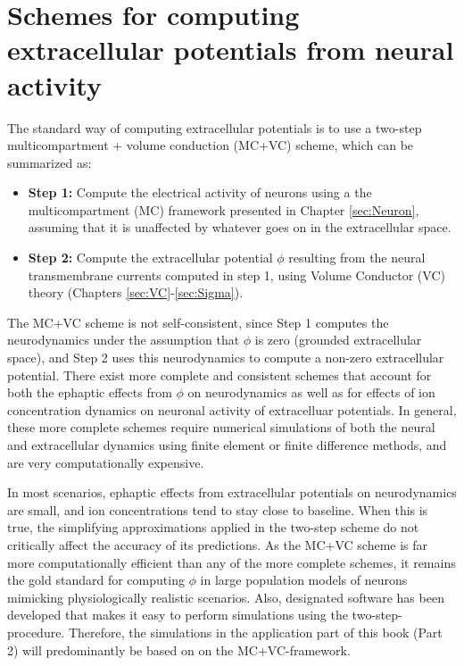 \chapter{Schemes for computing extracellular potentials from neural activity}
\label{sec:LFPy}


The standard way of computing extracellular potentials is to use a two-step multicompartment + volume conduction (MC+VC) scheme, which can be summarized as: 

\begin{itemize}
\item {\bf Step 1:} Compute the electrical activity of neurons using a the multicompartment (MC) framework presented in Chapter \ref{sec:Neuron}, assuming that it is unaffected by whatever goes on in the extracellular space. 
\item {\bf Step 2:} Compute the extracellular potential $\phi$ resulting from the neural transmembrane currents computed in step 1, using Volume Conductor (VC) theory (Chapters \ref{sec:VC}-\ref{sec:Sigma}). 
\end{itemize}

The MC+VC scheme is not self-consistent, since Step 1 computes the neurodynamics under the assumption that $\phi$ is zero (grounded extracellular space), and Step 2 uses this neurodynamics to compute a non-zero extracellular potential. There exist more complete and consistent schemes that account for both the ephaptic effects from $\phi$ on neurodynamics as well as for effects of ion concentration dynamics on neuronal activity of extracelluar potentials. In general, these more complete schemes require numerical simulations of both the neural and extracellular dynamics using finite element or finite difference methods, and are very computationally expensive.

In most scenarios, ephaptic effects from extracellular potentials on neurodynamics are small, and ion concentrations tend to stay close to baseline. When this is true, the simplifying approximations applied in the two-step scheme do not critically affect the accuracy of its predictions. As the MC+VC scheme is far more computationally efficient than any of the more complete schemes, it remains the gold standard for computing $\phi$ in large population models of neurons mimicking physiologically realistic scenarios. Also, designated software has been developed that makes it easy to perform simulations using the two-step-procedure. Therefore, the simulations in the application part of this book (Part 2) will predominantly be based on on the MC+VC-framework.

